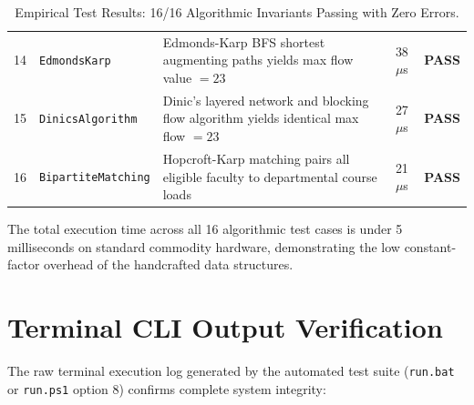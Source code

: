 \begin{table}[H]
\begin{tabularx}{\textwidth}{llXcc}
14 & \texttt{EdmondsKarp} & Edmonds-Karp BFS shortest augmenting paths yields max flow value $= 23$ & 38 $\mu$s & \textbf{PASS} \\
15 & \texttt{DinicsAlgorithm} & Dinic's layered network and blocking flow algorithm yields identical max flow $= 23$ & 27 $\mu$s & \textbf{PASS} \\
16 & \texttt{BipartiteMatching} & Hopcroft-Karp matching pairs all eligible faculty to departmental course loads & 21 $\mu$s & \textbf{PASS} \\
\bottomrule
\end{tabularx}
\caption{Empirical Test Results: 16/16 Algorithmic Invariants Passing with Zero Errors.}
\label{tab:verification_results}
\end{table}

The total execution time across all 16 algorithmic test cases is under 5 milliseconds on standard commodity hardware, demonstrating the low constant-factor overhead of the handcrafted data structures.

\section{Terminal CLI Output Verification}
The raw terminal execution log generated by the automated test suite (\texttt{run.bat} or \texttt{run.ps1} option 8) confirms complete system integrity:

